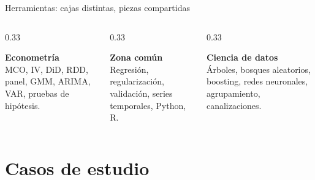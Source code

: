 \documentclass[aspectratio=169,11pt,table]{beamer}
\begin{document}
\begin{frame}{Herramientas: cajas distintas, piezas compartidas}
\begin{columns}[T,onlytextwidth]
\begin{column}{0.33\textwidth}
\begin{ccdebox}
\centering
\textbf{Econometría}\\[0.3em]
\small
MCO, IV, DiD, RDD, panel, GMM, ARIMA, VAR, pruebas de hipótesis.
\end{ccdebox}
\end{column}
\begin{column}{0.33\textwidth}
\begin{ccdebox}
\centering
\textbf{Zona común}\\[0.3em]
\small
Regresión, regularización, validación, series temporales, Python, R.
\end{ccdebox}
\end{column}
\begin{column}{0.33\textwidth}
\begin{ccdebox}
\centering
\textbf{Ciencia de datos}\\[0.3em]
\small
Árboles, bosques aleatorios, boosting, redes neuronales, agrupamiento, canalizaciones.
\end{ccdebox}
\end{column}
\end{columns}

\vspace{0.45cm}
\centering
{} \hspace{0.15cm}
 \hspace{0.15cm}
 \hspace{0.15cm}
 \hspace{0.15cm}
 \hspace{0.15cm}

\end{frame}

\section{Casos de estudio}
\end{document}
